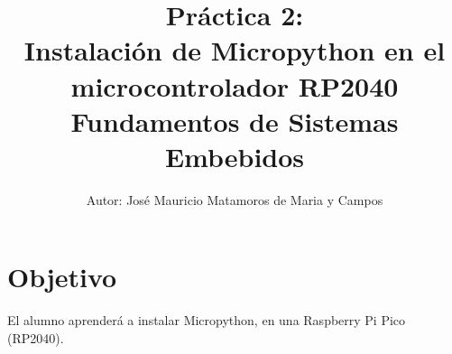\documentclass[letterpaper,10.5pt]{article}
\author{\footnotesize Autor: José Mauricio Matamoros de Maria y Campos}
\title{Práctica 2:\\Instalación de Micropython en el microcontrolador RP2040\\
{\large Fundamentos de Sistemas Embebidos}}
\date{}
\begin{document}
\maketitle

\section{Objetivo}%
\label{sec:objective}
El alumno aprenderá a instalar Micropython, en una Raspberry Pi Pico (RP2040).







\appendix


\end{document}
